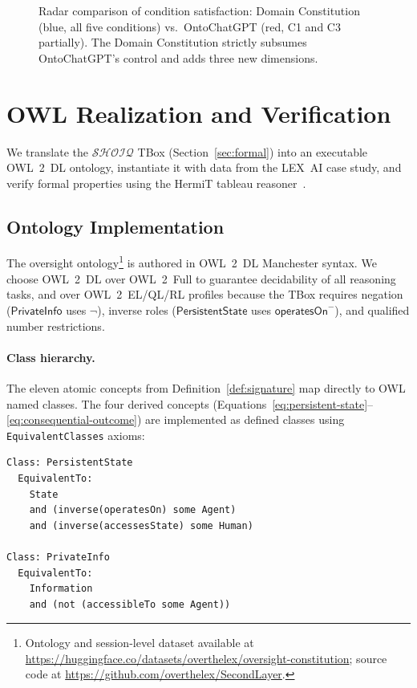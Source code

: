 \documentclass[11pt]{article}
\newcommand{\DL}{\ensuremath{\mathcal{SHOIQ}}\xspace}
\begin{document}
\begin{figure}[t]
\centering

\caption{Radar comparison of condition satisfaction: Domain Constitution (blue, all five conditions) vs.\ OntoChatGPT (red, C1 and C3 partially). The Domain Constitution strictly subsumes OntoChatGPT's control and adds three new dimensions.}
\label{fig:radar}
\end{figure}

\section{OWL Realization and Verification}
\label{sec:owl}

We translate the \DL TBox (Section~\ref{sec:formal}) into an executable OWL~2~DL ontology, instantiate it with data from the LEX~AI case study, and verify formal properties using the HermiT tableau reasoner~\citep{glimm2014hermit}.

\subsection{Ontology Implementation}
\label{sec:owl-impl}

The oversight ontology\footnote{Ontology and session-level dataset available at \url{https://huggingface.co/datasets/overthelex/oversight-constitution}; source code at \url{https://github.com/overthelex/SecondLayer}.} is authored in OWL~2~DL Manchester syntax.
We choose OWL~2~DL over OWL~2~Full to guarantee decidability of all reasoning tasks, and over OWL~2~EL/QL/RL profiles because the TBox requires negation ($\mathsf{PrivateInfo}$ uses $\neg$), inverse roles ($\mathsf{PersistentState}$ uses $\mathsf{operatesOn}^{-}$), and qualified number restrictions.

\paragraph{Class hierarchy.}
The eleven atomic concepts from Definition~\ref{def:signature} map directly to OWL named classes.
The four derived concepts (Equations~\ref{eq:persistent-state}--\ref{eq:consequential-outcome}) are implemented as defined classes using \texttt{EquivalentClasses} axioms:

\begin{small}
\begin{verbatim}
Class: PersistentState
  EquivalentTo:
    State
    and (inverse(operatesOn) some Agent)
    and (inverse(accessesState) some Human)

Class: PrivateInfo
  EquivalentTo:
    Information
    and (not (accessibleTo some Agent))
\end{verbatim}
\end{small}
\end{document}

